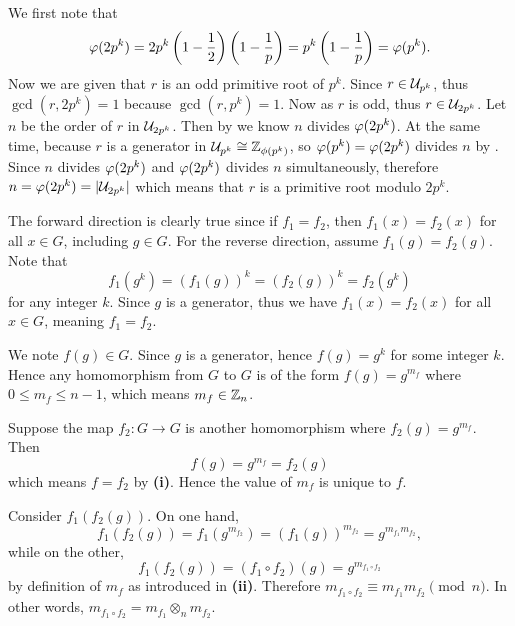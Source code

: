 \begin{questions}
    \item We first note that
    \[
        \varphi(2p^k) = 2p^k\left(1-\frac12\right)\left(1-\frac1p\right) = p^k\left(1-\frac1p\right) = \varphi(p^k).
    \]
    Now we are given that $r$ is an odd primitive root of $p^k$. Since $r \in \mathcal{U}_{p^k}$, thus $\gcd(r, 2p^k) = 1$ because $\gcd(r, p^k) = 1$. Now as $r$ is odd, thus $r \in \mathcal{U}_{2p^k}$. Let $n$ be the order of $r$ in $\mathcal{U}_{2p^k}$. Then by  we know $n$ divides $\varphi(2p^k)$. At the same time, because $r$ is a generator in $\mathcal{U}_{p^k} \cong \mathbb{Z}_{\phi(p^k)}$, so $\varphi(p^k) = \varphi(2p^k)$ divides $n$ by . Since $n$ divides $\varphi(2p^k)$ and $\varphi(2p^k)$ divides $n$ simultaneously, therefore $n = \varphi(2p^k) = |\mathcal{U}_{2p^k}|$ which means that $r$ is a primitive root modulo $2p^k$.

    \item \begin{partquestions}{\roman*}
        \item The forward direction is clearly true since if $f_1 = f_2$, then $f_1(x) = f_2(x)$ for all $x \in G$, including $g \in G$. For the reverse direction, assume $f_1(g) = f_2(g)$. Note that
        \[
            f_1(g^k) = (f_1(g))^k = (f_2(g))^k = f_2(g^k)
        \]
        for any integer $k$. Since $g$ is a generator, thus we have $f_1(x) = f_2(x)$ for all $x \in G$, meaning $f_1 = f_2$.

        \item We note $f(g) \in G$. Since $g$ is a generator, hence $f(g) = g^k$ for some integer $k$. Hence any homomorphism from $G$ to $G$ is of the form $f(g) = g^{m_f}$ where $0 \leq m_f \leq n-1$, which means $m_f \in \mathbb{Z}_n$.

        \item Suppose the map $f_2: G \to G$ is another homomorphism where $f_2(g) = g^{m_f}$. Then
        \[
            f(g) = g^{m_f} = f_2(g)
        \]
        which means $f = f_2$ by \textbf{(i)}. Hence the value of $m_f$ is unique to $f$.

        \item Consider $f_1(f_2(g))$. On one hand,
        \[
            f_1(f_2(g)) = f_1(g^{m_{f_2}}) = (f_1(g))^{m_{f_2}} = g^{m_{f_1}m_{f_2}},
        \]
        while on the other,
        \[
            f_1(f_2(g)) = (f_1 \circ f_2)(g) = g^{m_{f_1\circ f_2}}
        \]
        by definition of $m_f$ as introduced in \textbf{(ii)}. Therefore $m_{f_1\circ f_2} \equiv m_{f_1}m_{f_2} \pmod n$. In other words, $m_{f_1\circ f_2} = m_{f_1} \otimes_n m_{f_2}$.


\end{partquestions}
\end{questions}

